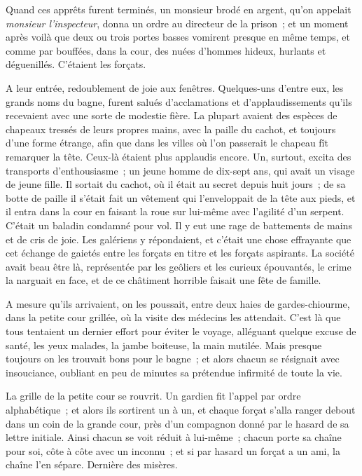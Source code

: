 \documentclass[french,twoside]{book} %
\begin{document}
Quand ces apprêts furent terminés, un monsieur brodé en argent, qu’on appelait \emph{monsieur l’inspecteur}, donna un ordre au directeur de la prison ; et un moment après voilà que deux ou trois portes basses vomirent presque en même temps, et comme par bouffées, dans la cour, des nuées d’hommes hideux, hurlants et déguenillés. C’étaient les forçats.\par
A leur entrée, redoublement de joie aux fenêtres. Quelques-uns d’entre eux, les grands noms du bagne, furent salués d’acclamations et d’applaudissements qu’ils recevaient avec une sorte de modestie fière. La plupart avaient des espèces de chapeaux tressés de  leurs propres mains, avec la paille du cachot, et toujours d’une forme étrange, afin que dans les villes où l’on passerait le chapeau fît remarquer la tête. Ceux-là étaient plus applaudis encore. Un, surtout, excita des transports d’enthousiasme ; un jeune homme de dix-sept ans, qui avait un visage de jeune fille. Il sortait du cachot, où il était au secret depuis huit jours ; de sa botte de paille il s’était fait un vêtement qui l’enveloppait de la tête aux pieds, et il entra dans la cour en faisant la roue sur lui-même avec l’agilité d’un serpent. C’était un baladin condamné pour vol. Il y eut une rage de battements de mains et de cris de joie. Les galériens y répondaient, et c’était une chose effrayante que cet échange de gaietés entre les forçats en titre et les forçats aspirants. La société avait beau être là, représentée par les geôliers et les curieux épouvantés, le crime la narguait en face, et de ce châtiment horrible faisait une fête de famille.\par
A mesure qu’ils arrivaient, on les poussait, entre deux haies de gardes-chiourme, dans la petite cour grillée, où la visite des médecins les attendait. C’est là que tous tentaient un dernier effort pour éviter le voyage, alléguant quelque excuse de santé, les yeux malades, la jambe boiteuse, la main mutilée. Mais presque toujours on les trouvait bons pour le bagne ; et alors chacun se résignait avec insouciance, oubliant en peu de minutes sa prétendue infirmité de toute la vie.\par
La grille de la petite cour se rouvrit. Un gardien fit l’appel par ordre alphabétique ; et alors ils sortirent  un à un, et chaque forçat s’alla ranger debout dans un coin de la grande cour, près d’un compagnon donné par le hasard de sa lettre initiale. Ainsi chacun se voit réduit à lui-même ; chacun porte sa chaîne pour soi, côte à côte avec un inconnu ; et si par hasard un forçat a un ami, la chaîne l’en sépare. Dernière des misères.\par
\end{document}

